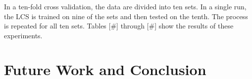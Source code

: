 \documentclass[11pt]{article}
\begin{document}
In a ten-fold cross validation, the data are divided into ten sets. In a single run, the LCS is trained on nine of the sets and then tested on the tenth. The process is repeated for all ten sets. Tables [\#] through [\#] show the results of these experiments.



\section{Future Work and Conclusion}






\end{document}
